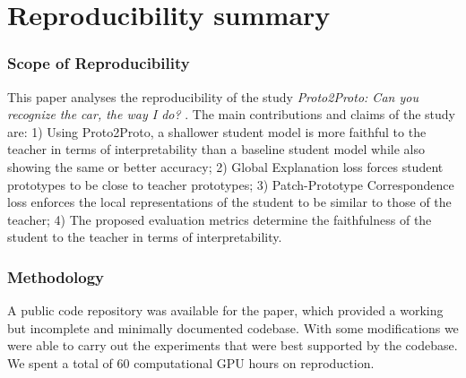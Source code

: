 \section*{\centering Reproducibility summary} 


\subsubsection*{Scope of Reproducibility}

This paper analyses the reproducibility of the study \textit{Proto2Proto: Can you recognize the car, the way I do?} \cite{keswani2022proto2proto}. The main contributions and claims of the study are: 1) Using Proto2Proto, a shallower student model is more faithful to the teacher in terms of interpretability than a baseline student model while also showing the same or better accuracy; 2) Global Explanation loss forces student prototypes to be close to teacher prototypes; 3) Patch-Prototype Correspondence loss enforces the local representations of the student to be similar to those of the teacher; 4) The proposed evaluation metrics determine the faithfulness of the student to the teacher in terms of interpretability. 

\subsubsection*{Methodology}


A public code repository was available for the paper, which provided a working but incomplete and minimally documented codebase. With some modifications we were able to carry out the experiments that were best supported by the codebase. We spent a total of 60 computational GPU hours on reproduction. 

